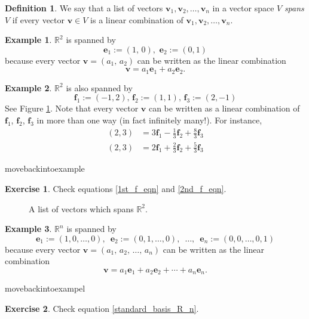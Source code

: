 \documentclass[a4paper,11pt]{book}
\theoremstyle{definition}
\newtheorem{definition}[theorem]{Definition}
\newtheorem{exercise}{Exercise}
\newtheorem{example_environment}{Example}[chapter]
\newcommand{\be}{\begin{equation}}
\newcommand{\ee}{\end{equation}}
\newcommand{\ve}[1]{\mathbf{#1}}
\newenvironment{example}
	{
		\begin{oframed} 
		\begin{example_environment}
	}
	{
		\end{example_environment}
		\end{oframed}
	}
\begin{document}
\begin{definition} We say that a list of vectors $\ve{v}_1, \ve{v}_2, \ldots, \ve{v}_n$ in a vector space $V$ {\em spans} $V$ if every vector $\ve{v} \in V$ is a linear combination of $\ve{v}_1, \ve{v}_2, \ldots, \ve{v}_n$. 
\end{definition}

\begin{example} $\mathbb{R}^2$ is spanned by
\[
 \ve{e}_1 := (1, \, 0), \, \, \ve{e}_2 := (0, 1)
\]
because every vector $\ve{v} = (a_1, \, a_2)$ can be written as the linear combination
\[
 \ve{v} = a_1 \ve{e}_1 + a_2 \ve{e}_2.
\]
\end{example}
\begin{example} $\mathbb{R}^2$ is also spanned by \label{three_vectors_spanning_R2_example}
\[
 \ve{f}_1 := (-1, 2), \, \ve{f}_2 := (1, 1), \, \ve{f}_3 := (2, -1)
\]
See Figure \ref{spanning_set_R2}. Note that every vector $\ve{v}$ can be written as a linear combination of $\ve{f}_1$, $\ve{f}_2$, $\ve{f}_3$ in more than one way (in fact infinitely many!). For instance,
\begin{align}
 (2, 3) &= 3 \ve{f}_1  - \frac{1}{3} \ve{f}_2 + \frac{8}{3} \ve{f}_3 \label{1st_f_eqn} \\
 (2,3) &= 2 \ve{f}_1 + \frac{2}{3} \ve{f}_2 + \frac{5}{3} \ve{f}_3 \label{2nd_f_eqn}
\end{align}


\end{example}
movebackintoexample
\begin{exercise} Check equations \eqref{1st_f_eqn} and \eqref{2nd_f_eqn}.
\end{exercise}
\begin{figure}[t] 
	\centering
	\caption{\label{spanning_set_R2} A list of vectors which spans $\mathbb{R}^2$.}
\end{figure}

\begin{example} $\mathbb{R}^n$ is spanned by  \label{Rn_spanning_set}
\be \label{defn_of_e_i}
\ve{e}_1 := (1, 0, \ldots, 0), \,\,\, \ve{e}_2 := (0, 1, \ldots, 0), \,\,\, \ldots, \,\,\, \ve{e}_n := (0, 0, \ldots, 0, 1)
\ee
because every vector $\ve{v} = (a_1, \,a_2, \, \ldots, \, a_n)$ can be written as the linear combination
\be \label{standard_basis_R_n}
 \ve{v} = a_1 \ve{e}_1 + a_2 \ve{e}_2 + \cdots + a_n \ve{e}_n.
\ee

\end{example}
movebackintoexampel
\begin{exercise} Check equation \eqref{standard_basis_R_n}.
\end{exercise}
\end{document}
